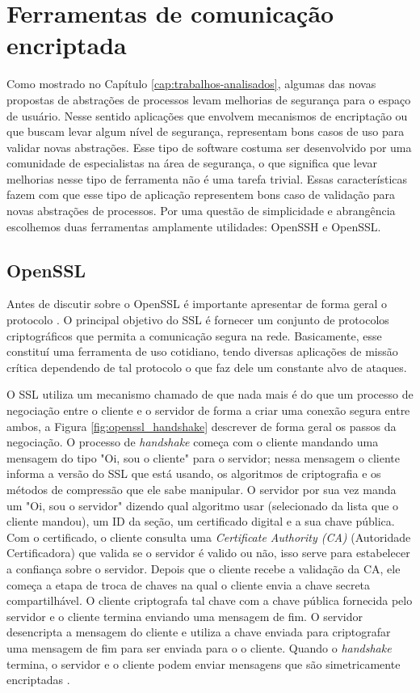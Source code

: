 \section{Ferramentas de comunicação encriptada}
\label{sec:com_enc}

Como mostrado no Capítulo \ref{cap:trabalhos-analisados}, algumas das novas
propostas de abstrações de processos levam melhorias de segurança para o espaço
de usuário. Nesse sentido aplicações que envolvem mecanismos de encriptação ou
que buscam levar algum nível de segurança, representam bons casos de uso para
validar novas abstrações. Esse tipo de software costuma ser desenvolvido por
uma comunidade de especialistas na área de segurança, o que significa que levar
melhorias nesse tipo de ferramenta não é uma tarefa trivial. Essas
características fazem com que esse tipo de aplicação representem bons caso de
validação para novas abstrações de processos. Por uma questão de simplicidade e
abrangência escolhemos duas ferramentas amplamente utilidades: OpenSSH e
OpenSSL.

\subsection{OpenSSL}
\label{sec:openssl}

Antes de discutir sobre o OpenSSL é importante apresentar de forma geral o
protocolo . O principal objetivo do
SSL é fornecer um conjunto de protocolos criptográficos que permita a
comunicação segura na rede. Basicamente, esse constituí uma ferramenta de uso
cotidiano, tendo diversas aplicações de missão crítica dependendo de tal
protocolo o que faz dele um constante alvo de ataques.

O SSL utiliza um mecanismo chamado de  que
nada mais é do que um processo de negociação entre o cliente e o servidor de
forma a criar uma conexão segura entre ambos, a Figura
\ref{fig:openssl_handshake} descrever de forma geral os passos da negociação. O
processo de \textit{handshake} começa com o cliente mandando uma mensagem do
tipo "Oi, sou o cliente" para o servidor; nessa mensagem o cliente informa a
versão do SSL que está usando, os algoritmos de criptografia e os métodos de
compressão que ele sabe manipular. O servidor por sua vez manda um "Oi, sou o
servidor" dizendo qual algoritmo usar (selecionado da lista que o cliente
mandou), um ID da seção, um certificado digital e a sua chave pública. Com o
certificado, o cliente consulta uma \textit{Certificate Authority (CA)}
(Autoridade Certificadora) que valida se o servidor é valido ou não, isso serve
para estabelecer a confiança sobre o servidor. Depois que o cliente recebe a
validação da CA, ele começa a etapa de troca de chaves na qual o cliente envia
a chave secreta compartilhável. O cliente criptografa tal chave com a chave
pública fornecida pelo servidor e o cliente termina enviando uma mensagem de
fim. O servidor desencripta a mensagem do cliente e utiliza a chave enviada
para criptografar uma mensagem de fim para ser enviada para o o cliente. Quando
o \textit{handshake} termina, o servidor e o cliente podem enviar mensagens que
são simetricamente encriptadas \citep{openssl}.

